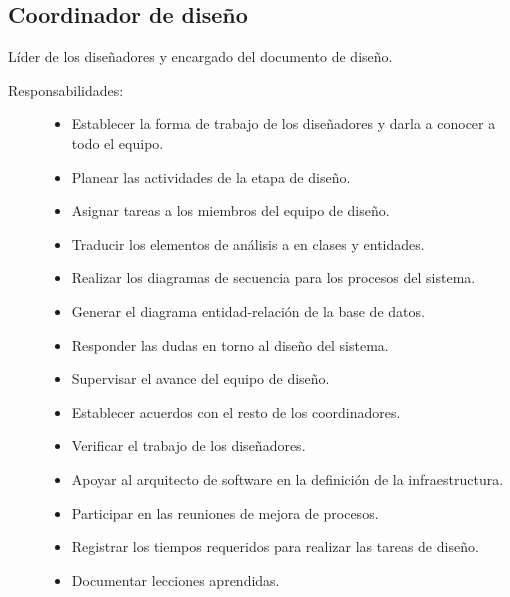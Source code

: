 \subsection{Coordinador de diseño}
	Líder de los diseñadores y encargado del documento de diseño.
\begin{description}
	\item[Responsabilidades:] \cdtEmpty 	
    \begin{itemize}
    	\item Establecer la forma de trabajo de los diseñadores y darla a conocer a todo el equipo.
    	\item Planear las actividades de la etapa de diseño.
    	\item Asignar tareas a los miembros del equipo de diseño.
    	\item Traducir los elementos de análisis a en clases y entidades.
    	\item Realizar los diagramas de secuencia para los procesos del sistema.
    	\item Generar el diagrama entidad-relación de la base de datos.
    	\item Responder las dudas en torno al diseño del sistema.
    	\item Supervisar el avance del equipo de diseño.
    	\item Establecer acuerdos con el resto de los coordinadores.
    	\item Verificar el trabajo de los diseñadores.
    	\item Apoyar al arquitecto de software en la definición de la infraestructura.
    	\item Participar en las reuniones de mejora de procesos.
    	\item Registrar los tiempos requeridos para realizar las tareas de diseño.
    	\item Documentar lecciones aprendidas.
    \end{itemize}
\end{description}

